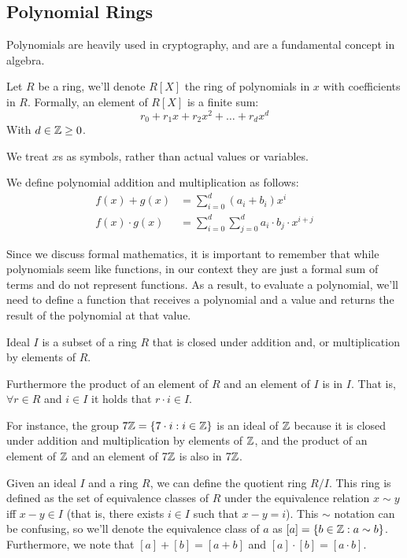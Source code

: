 \subsection{Polynomial Rings}
Polynomials are heavily used in cryptography, and are a fundamental concept in algebra.
\begin{defn}
    Let $R$ be a ring, we'll denote $R[X]$ the ring of polynomials
    in $x$ with coefficients in $R$. Formally, an element of $R[X]$ is a finite
    sum: $$ r_0 + r_1x +r_2x^2 +\dots +r_dx^d$$
    With $d\in\mathbb{Z}\ge0$.

    We treat $x$s as symbols, rather than actual values or variables.

    We define polynomial addition and multiplication as follows:
    \begin{align*}
        f(x) + g(x) &= \sum_{i=0}^{d}{(a_i+b_i)x^i} \\
        f(x) \cdot g(x) &= \sum_{i=0}^{d}{\sum_{j=0}^{d}{a_i\cdot b_j\cdot x^{i+j}}}
    \end{align*}
\end{defn}

Since we discuss formal mathematics, it is important to remember that while polynomials seem like functions,
in our context they are just a formal sum of terms and do not represent functions.
As a result, to evaluate a polynomial, we'll need to define a function that receives a polynomial 
and a value and returns the result of the polynomial at that value.


\begin{defn}
    Ideal $I$ is a subset of a ring $R$ that is closed under addition and, or multiplication by elements of $R$.

    Furthermore the product of an element of $R$ and an element of $I$ is in $I$.
    That is, $\forall r\in R$ and $i\in I$ it holds that $r\cdot i\in I$.
\end{defn}

For instance, the group $7\mathbb{Z}=\{7\cdot i:i\in\mathbb{Z}\}$ is an ideal of $\mathbb{Z}$ because it is closed
under addition and multiplication by elements of $\mathbb{Z}$,
and the product of an element of $\mathbb{Z}$ and an element of $7\mathbb{Z}$ is also in $7\mathbb{Z}$.

Given an ideal $I$ and a ring $R$, we can define the quotient ring $R/I$.
This ring is defined as the set of equivalence classes of $R$ under the equivalence relation 
$x\sim y$ iff $x-y\in I$ (that is, there exists $i\in I$ such that $x-y=i$).
This $\sim$ notation can be confusing, so we'll denote the equivalence class of $a$ as $[a]=\{b\in \mathbb{Z} :a\sim b \}$.
Furthermore, we note that $[a]+[b]=[a+b]$ and $[a]\cdot[b]=[a\cdot b]$.

